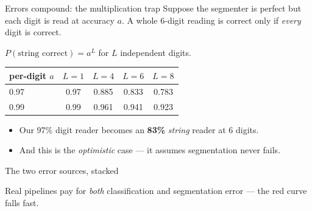 \documentclass[10pt,aspectratio=169]{beamer}
\begin{document}
\begin{frame}{Errors compound: the multiplication trap}
  Suppose the segmenter is perfect but each digit is read at accuracy $a$. A whole 6-digit
  reading is correct only if \emph{every} digit is correct.
  \begin{mathbox}
    $\displaystyle P(\text{string correct}) = a^{L}$ \quad for $L$ independent digits.
  \end{mathbox}
  \begin{center}
  \begin{tabular}{@{}lcccc@{}}
    \toprule
    per-digit $a$ & $L{=}1$ & $L{=}4$ & $L{=}6$ & $L{=}8$ \\
    \midrule
    0.97 & 0.97 & 0.885 & 0.833 & 0.783 \\
    0.99 & 0.99 & 0.961 & 0.941 & 0.923 \\
    \bottomrule
  \end{tabular}
  \end{center}
  \begin{itemize}
    \item Our 97\% digit reader becomes an \textbf{83\%} \emph{string} reader at 6 digits.
    \item And this is the \emph{optimistic} case --- it assumes segmentation never fails.
  \end{itemize}
\end{frame}

\begin{frame}{The two error sources, stacked}
  \begin{center}
  \end{center}
  Real pipelines pay for \emph{both} classification and segmentation error --- the red curve falls fast.
\end{frame}
\end{document}
